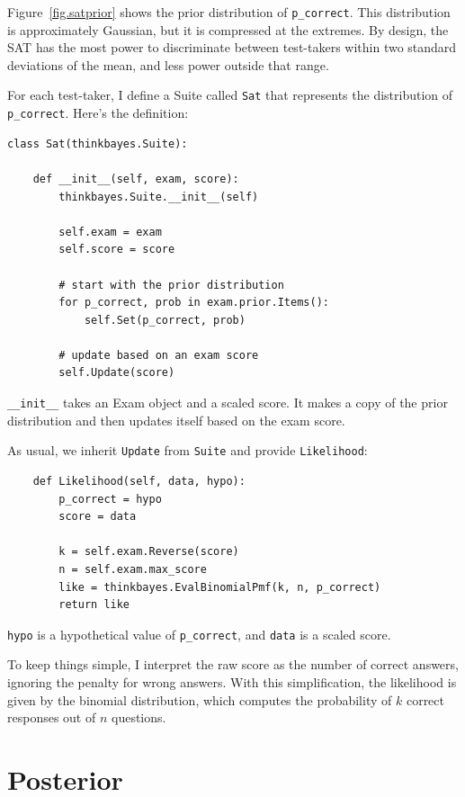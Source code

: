 \documentclass[12pt]{book}
\begin{document}
Figure~\ref{fig.satprior} shows the prior distribution of
\verb"p_correct".  This distribution is approximately Gaussian, but it
is compressed at the extremes.  By design, the SAT has the most power
to discriminate between test-takers within two standard deviations of
the mean, and less power outside that range.

For each test-taker, I define a Suite called {\tt Sat} that
represents the distribution of \verb"p_correct".  Here's the definition:

\begin{verbatim}
class Sat(thinkbayes.Suite):

    def __init__(self, exam, score):
        thinkbayes.Suite.__init__(self)

        self.exam = exam
        self.score = score

        # start with the prior distribution
        for p_correct, prob in exam.prior.Items():
            self.Set(p_correct, prob)

        # update based on an exam score
        self.Update(score)
\end{verbatim}

\verb"__init__" takes an Exam object and a scaled score.  It makes a
copy of the prior distribution and then updates itself based on the
exam score.

As usual, we inherit {\tt Update} from {\tt Suite} and provide
{\tt Likelihood}:

\begin{verbatim}
    def Likelihood(self, data, hypo):
        p_correct = hypo
        score = data

        k = self.exam.Reverse(score)
        n = self.exam.max_score
        like = thinkbayes.EvalBinomialPmf(k, n, p_correct)
        return like
\end{verbatim}

{\tt hypo} is a hypothetical
value of \verb"p_correct", and {\tt data} is a scaled score.

To keep things simple, I interpret the raw score as the number of
correct answers, ignoring the penalty for wrong answers.  With
this simplification, the likelihood is given by the binomial
distribution, which computes the probability of $k$ correct
responses out of $n$ questions.


\section{Posterior}
\end{document}
